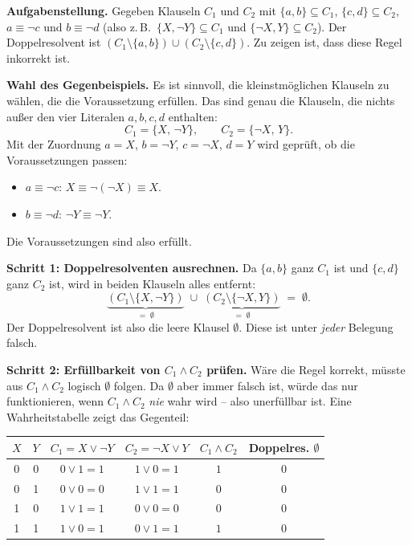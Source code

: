 \documentclass[a4paper,12pt]{article}
\begin{document}
\medskip
\textbf{Aufgabenstellung.}
Gegeben Klauseln $C_1$ und $C_2$ mit $\{a,b\} \subseteq C_1$,
$\{c,d\} \subseteq C_2$, $a \equiv \neg c$ und $b \equiv \neg d$
(also z.\,B.\ $\{X, \neg Y\} \subseteq C_1$ und $\{\neg X, Y\} \subseteq C_2$).
Der Doppelresolvent ist
$(C_1 \setminus \{a,b\}) \cup (C_2 \setminus \{c,d\})$.
Zu zeigen ist, dass diese Regel inkorrekt ist.

\medskip
\textbf{Wahl des Gegenbeispiels.}
Es ist sinnvoll, die kleinstm\"oglichen Klauseln zu w\"ahlen, die die
Voraussetzung erf\"ullen. Das sind genau die Klauseln, die nichts au\ss er
den vier Literalen $a, b, c, d$ enthalten:
\[
C_1 = \{X,\, \neg Y\}, \qquad C_2 = \{\neg X,\, Y\}.
\]
Mit der Zuordnung $a = X$, $b = \neg Y$, $c = \neg X$, $d = Y$ wird
gepr\"uft, ob die Voraussetzungen passen:
\begin{itemize}[nosep]
\item $a \equiv \neg c$: $X \equiv \neg(\neg X) \equiv X$. \checkmark
\item $b \equiv \neg d$: $\neg Y \equiv \neg Y$. \checkmark
\end{itemize}
Die Voraussetzungen sind also erf\"ullt.

\medskip
\textbf{Schritt 1: Doppelresolventen ausrechnen.}
Da $\{a, b\}$ ganz $C_1$ ist und $\{c, d\}$ ganz $C_2$ ist, wird in beiden
Klauseln alles entfernt:
\[
\underbrace{(C_1 \setminus \{X, \neg Y\})}_{=\;\emptyset}
\;\cup\;
\underbrace{(C_2 \setminus \{\neg X, Y\})}_{=\;\emptyset}
\;=\; \emptyset.
\]
Der Doppelresolvent ist also die leere Klausel $\emptyset$. Diese ist
unter \emph{jeder} Belegung falsch.

\medskip
\textbf{Schritt 2: Erf\"ullbarkeit von $C_1 \wedge C_2$ pr\"ufen.}
W\"are die Regel korrekt, m\"usste aus $C_1 \wedge C_2$ logisch $\emptyset$
folgen. Da $\emptyset$ aber immer falsch ist, w\"urde das nur funktionieren,
wenn $C_1 \wedge C_2$ \emph{nie} wahr wird -- also unerf\"ullbar ist. Eine
Wahrheitstabelle zeigt das Gegenteil:

\begin{center}
\renewcommand{\arraystretch}{1.2}
\begin{tabular}{cc|cc|c|c}
\toprule
$X$ & $Y$ & $C_1 = X \vee \neg Y$ & $C_2 = \neg X \vee Y$ & $C_1 \wedge C_2$ & Doppelres. $\emptyset$ \\
\midrule
0 & 0 & $0 \vee 1 = 1$ & $1 \vee 0 = 1$ & $1$ & $0$ \\
0 & 1 & $0 \vee 0 = 0$ & $1 \vee 1 = 1$ & $0$ & $0$ \\
1 & 0 & $1 \vee 1 = 1$ & $0 \vee 0 = 0$ & $0$ & $0$ \\
1 & 1 & $1 \vee 0 = 1$ & $0 \vee 1 = 1$ & $1$ & $0$ \\
\bottomrule
\end{tabular}
\end{center}
\end{document}
